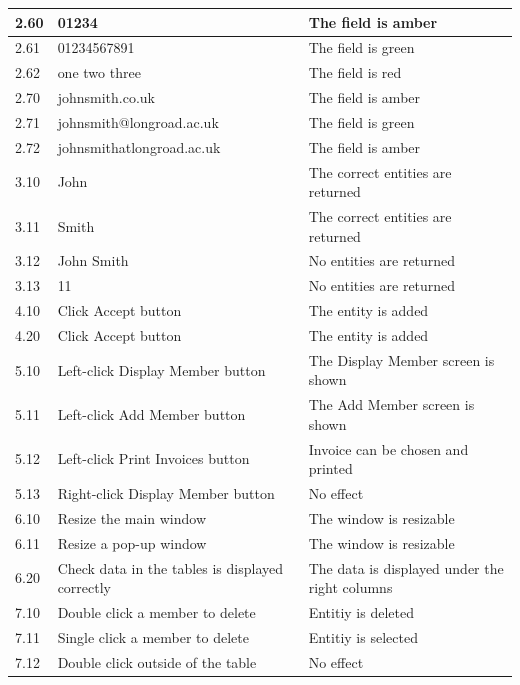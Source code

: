 \begin{center}
\begin{longtable}{|p{2cm}|p{5cm}|p{8cm}|}
        2.60 & 01234 & The field is amber \\ \hline
        2.61 & 01234567891 & The field is green \\ \hline
        2.62 & one two three & The field is red \\ \hline
       
        2.70 & johnsmith.co.uk & The field is amber \\ \hline
        2.71 & johnsmith@longroad.ac.uk & The field is green \\ \hline
        2.72 & johnsmithatlongroad.ac.uk & The field is amber \\ \hline
        
        3.10 & John & The correct entities are returned \\ \hline
        3.11 & Smith & The correct entities are returned \\ \hline
        3.12 & John Smith &  No entities are returned \\ \hline
        3.13 & 11 & No entities are returned \\ \hline
        
        4.10 & Click Accept button & The entity is added \\ \hline
        
        4.20 & Click Accept button & The entity is added \\ \hline
        
        5.10 & Left-click Display Member button & The Display Member screen is shown \\ \hline
        5.11 & Left-click Add Member button & The Add Member screen is shown \\ \hline
        5.12 & Left-click Print Invoices button & Invoice can be chosen and printed \\ \hline
        5.13 & Right-click Display Member button & No effect \\ \hline
        
        6.10 & Resize the main window & The window is resizable \\ \hline
        6.11 & Resize a pop-up window & The window is resizable\\ \hline
        
        6.20 & Check data in the tables is displayed correctly & The data is displayed under the right columns \\ \hline

       \rowcolor{lightgrey} 7.10 & Double click a member to delete & Entitiy is deleted \\ \hline
       \rowcolor{lightgrey} 7.11 & Single click a member to delete & Entitiy is selected \\ \hline
       \rowcolor{lightgrey} 7.12 & Double click outside of the table & No effect \\ \hline


\end{longtable}
\end{center}
